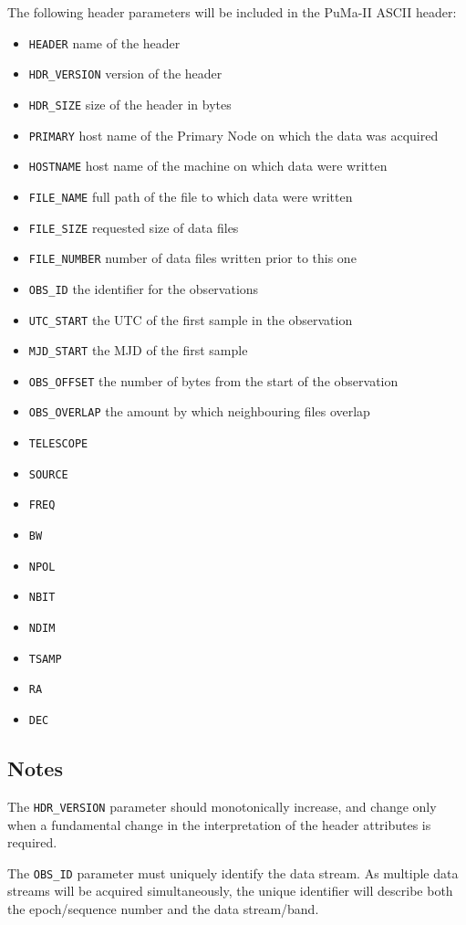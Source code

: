 The following header parameters will be included in the PuMa-II ASCII header:
\begin{itemize}
\item{\tt HEADER} name of the header
\item{\tt HDR\_VERSION} version of the header
\item{\tt HDR\_SIZE} size of the header in bytes
\item{\tt PRIMARY} host name of the Primary Node on which the data was acquired
\item{\tt HOSTNAME} host name of the machine on which data were written
\item{\tt FILE\_NAME} full path of the file to which data were written
\item{\tt FILE\_SIZE} requested size of data files
\item{\tt FILE\_NUMBER} number of data files written prior to this one
\item{\tt OBS\_ID} the identifier for the observations
\item{\tt UTC\_START} the UTC of the first sample in the observation
\item{\tt MJD\_START} the MJD of the first sample
\item{\tt OBS\_OFFSET} the number of bytes from the start of the observation
\item{\tt OBS\_OVERLAP} the amount by which neighbouring files overlap
\item{\tt TELESCOPE}
\item{\tt SOURCE}
\item{\tt FREQ}
\item{\tt BW}
\item{\tt NPOL}
\item{\tt NBIT}
\item{\tt NDIM}
\item{\tt TSAMP}
\item{\tt RA}
\item{\tt DEC}
\end{itemize}


\subsection{Notes}

The {\tt HDR\_VERSION} parameter should monotonically increase, and
change only when a fundamental change in the interpretation of the
header attributes is required.

The {\tt OBS\_ID} parameter must uniquely identify the data stream.
As multiple data streams will be acquired simultaneously, the unique
identifier will describe both the epoch/sequence number and the data
stream/band.

